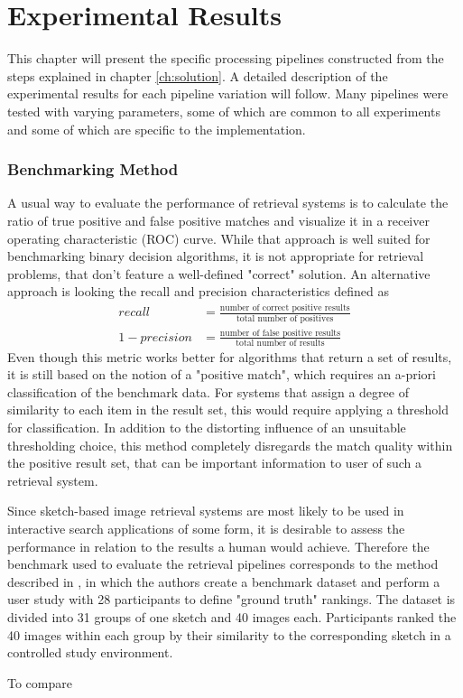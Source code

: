 \chapter{Experimental Results}\label{ch:results}

This chapter will present the specific processing pipelines constructed from
the steps explained in chapter \ref{ch:solution}. A detailed description of the
experimental results for each pipeline variation will follow. Many pipelines
were tested with varying parameters, some of which are common to all
experiments and some of which are specific to the implementation.

\subsection{Benchmarking Method}

A usual way to evaluate the performance of retrieval systems is to calculate
the ratio of true positive and false positive matches and visualize it in a
receiver operating characteristic (ROC) curve. While that approach is well
suited for benchmarking binary decision algorithms, it is not appropriate for
retrieval problems, that don't feature a well-defined "correct" solution. An
alternative approach is looking the recall and precision characteristics
defined as
\begin{align*}
    recall & = \frac{\text{number of correct positive results}}{\text{total number of positives}} \\
    1 - precision & = \frac{\text{number of false positive results}}{\text{total number of results}}
\end{align*}
Even though this metric works better for algorithms that return a set of
results, it is still based on the notion of a "positive match", which requires
an a-priori classification of the benchmark data. For systems that assign a
degree of similarity to each item in the result set, this would require
applying a threshold for classification. In addition to the distorting
influence of an unsuitable thresholding choice, this method completely
disregards the match quality within the positive result set, that can be
important information to user of such a retrieval system.

Since sketch-based image retrieval systems are most likely to be used in
interactive search applications of some form, it is desirable to assess the
performance in relation to the results a human would achieve.  Therefore the
benchmark used to evaluate the retrieval pipelines corresponds to the method
described in \autocite{eitz_sketch-based_2010}, in which the authors create a
benchmark dataset and perform a user study with 28 participants to define
"ground truth" rankings. The dataset is divided into 31 groups of one sketch
and 40 images each. Participants ranked the 40 images within each group by
their similarity to the corresponding sketch in a controlled study environment.

To compare
